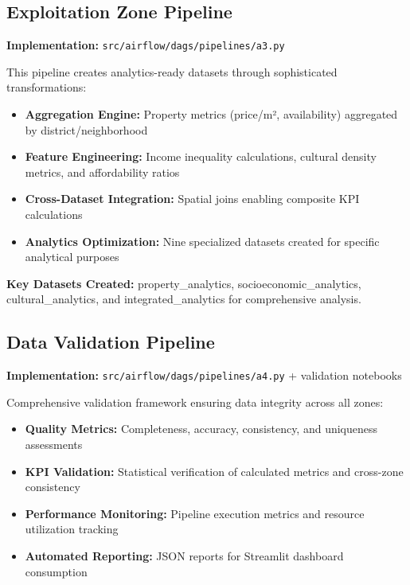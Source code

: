 \subsection{Exploitation Zone Pipeline}

\textbf{Implementation:} \texttt{src/airflow/dags/pipelines/a3.py}

This pipeline creates analytics-ready datasets through sophisticated transformations:

\begin{itemize}[nosep]
\item \textbf{Aggregation Engine:} Property metrics (price/m², availability) aggregated by district/neighborhood
\item \textbf{Feature Engineering:} Income inequality calculations, cultural density metrics, and affordability ratios
\item \textbf{Cross-Dataset Integration:} Spatial joins enabling composite KPI calculations
\item \textbf{Analytics Optimization:} Nine specialized datasets created for specific analytical purposes
\end{itemize}

\textbf{Key Datasets Created:} property\_analytics, socioeconomic\_analytics, cultural\_analytics, and integrated\_analytics for comprehensive analysis.

\subsection{Data Validation Pipeline}

\textbf{Implementation:} \texttt{src/airflow/dags/pipelines/a4.py} + validation notebooks

Comprehensive validation framework ensuring data integrity across all zones:

\begin{itemize}[nosep]
\item \textbf{Quality Metrics:} Completeness, accuracy, consistency, and uniqueness assessments
\item \textbf{KPI Validation:} Statistical verification of calculated metrics and cross-zone consistency
\item \textbf{Performance Monitoring:} Pipeline execution metrics and resource utilization tracking
\item \textbf{Automated Reporting:} JSON reports for Streamlit dashboard consumption
\end{itemize}
